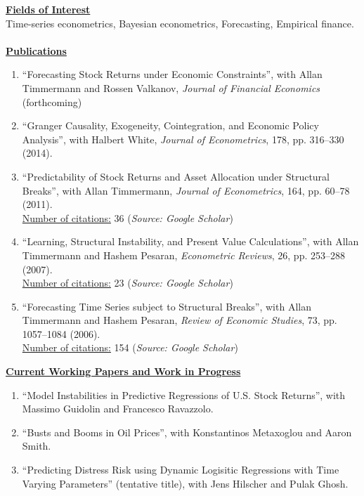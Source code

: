 \documentclass[12pt]{article}
\begin{document}
\underline{\textbf{Fields of Interest}}\\
Time-series econometrics, Bayesian econometrics, Forecasting, Empirical finance.\\ \\
\underline{\textbf{Publications}}
\begin{enumerate}	
	\item ``Forecasting Stock Returns under Economic Constraints'', with Allan Timmermann and Rossen Valkanov, \emph{Journal of Financial Economics} (forthcoming)
	
	\item ``Granger Causality, Exogeneity, Cointegration, and Economic Policy Analysis'', with Halbert White, \emph{Journal of Econometrics}, 178, pp. 316--330 (2014).
	
	\item ``Predictability of Stock Returns and Asset Allocation under Structural Breaks'', with Allan Timmermann, \emph{Journal of Econometrics}, 164, pp. 60--78 (2011). \\
	\underline{Number of citations:} 36 (\emph{Source: Google Scholar})
	
	\item ``Learning, Structural Instability, and Present Value Calculations'', with Allan Timmermann and Hashem Pesaran, \emph{Econometric Reviews}, 26, pp. 253--288 (2007). \\
	\underline{Number of citations:} 23 (\emph{Source: Google Scholar})

	\item ``Forecasting Time Series subject to Structural Breaks'', with Allan Timmermann and Hashem Pesaran, \emph{Review of Economic Studies}, 73, pp. 1057--1084 (2006). \\
	\underline{Number of citations:} 154 (\emph{Source: Google Scholar})

    \setcounter{enumTemp}{\theenumi}
 \end{enumerate}
\underline{\textbf{Current Working Papers and Work in Progress}}
\begin{enumerate}
	\setcounter{enumi}{\theenumTemp}
	\item ``Model Instabilities in Predictive Regressions of U.S. Stock Returns'', with Massimo Guidolin and Francesco Ravazzolo.
	\item ``Busts and Booms in Oil Prices'', with Konstantinos Metaxoglou  and Aaron Smith.
	\item ``Predicting Distress Risk using Dynamic Logisitic Regressions with Time Varying Parameters'' (tentative title), with Jens Hilscher and Pulak Ghosh.
\end{enumerate}
\end{document}
